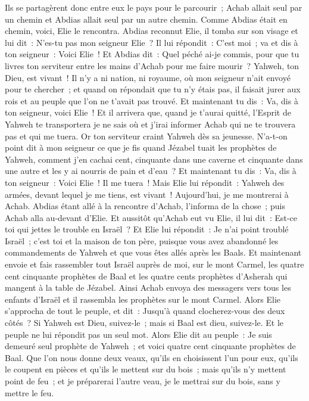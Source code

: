 \begin{multicols}{2}
Ils se partagèrent donc entre eux le pays pour le parcourir~; Achab allait seul par un chemin et Abdias allait seul par un autre chemin.
Comme Abdias était en chemin, voici, Elie le rencontra. Abdias reconnut Elie, il tomba sur son visage et lui dit~: N'es-tu pas mon seigneur Elie~?
Il lui répondit~: C'est moi~; va et dis à ton seigneur~: Voici Elie~!
Et Abdias dit~: Quel péché ai-je commis, pour que tu livres ton serviteur entre les mains d'Achab pour me faire mourir~?
Yahweh, ton Dieu, est vivant~! Il n'y a ni nation, ni royaume, où mon seigneur n'ait envoyé pour te chercher~; et quand on répondait que tu n'y étais pas, il faisait jurer aux rois et au peuple que l'on ne t'avait pas trouvé.
Et maintenant tu dis~: Va, dis à ton seigneur, voici Elie~!
Et il arrivera que, quand je t'aurai quitté, l'Esprit de Yahweh te transportera je ne sais où et j'irai informer Achab qui ne te trouvera pas et qui me tuera. Or ton serviteur craint Yahweh dès sa jeunesse.
N'a-t-on point dit à mon seigneur ce que je fis quand Jézabel tuait les prophètes de Yahweh, comment j'en cachai cent, cinquante dans une caverne et cinquante dans une autre et les y ai nourris de pain et d'eau~?
Et maintenant tu dis~: Va, dis à ton seigneur~: Voici Elie~! Il me tuera~!
Mais Elie lui répondit~: Yahweh des armées, devant lequel je me tiens, est vivant~! Aujourd'hui, je me montrerai à Achab.
Abdias étant allé à la rencontre d'Achab, l'informa de la chose~; puis Achab alla au-devant d'Elie.
Et aussitôt qu'Achab eut vu Elie, il lui dit~: Est-ce toi qui jettes le trouble en Israël~?
Et Elie lui répondit~: Je n'ai point troublé Israël~; c'est toi et la maison de ton père, puisque vous avez abandonné les commandements de Yahweh et que vous êtes allés après les Baals.
Et maintenant envoie et fais rassembler tout Israël auprès de moi, sur le mont Carmel, les quatre cent cinquante prophètes de Baal et les quatre cents prophètes d'Asherah qui mangent à la table de Jézabel.
Ainsi Achab envoya des messagers vers tous les enfants d'Israël et il rassembla les prophètes sur le mont Carmel.
Alors Elie s'approcha de tout le peuple, et dit~: Jusqu'à quand clocherez-vous des deux côtés~? Si Yahweh est Dieu, suivez-le~; mais si Baal est dieu, suivez-le. Et le peuple ne lui répondit pas un seul mot.
Alors Elie dit au peuple~: Je suis demeuré seul prophète de Yahweh~; et voici quatre cent cinquante prophètes de Baal.
Que l'on nous donne deux veaux, qu'ils en choisissent l'un pour eux, qu'ils le coupent en pièces et qu'ils le mettent sur du bois~; mais qu'ils n'y mettent point de feu~; et je préparerai l'autre veau, je le mettrai sur du bois, sans y mettre le feu.

\end{multicols}
